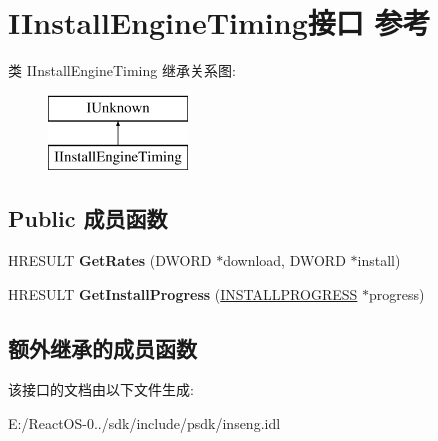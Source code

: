 \hypertarget{interface_i_install_engine_timing}{}\section{I\+Install\+Engine\+Timing接口 参考}
\label{interface_i_install_engine_timing}
类 I\+Install\+Engine\+Timing 继承关系图\+:\begin{figure}[H]
\begin{center}
\leavevmode
\includegraphics[height=2.000000cm]{interface_i_install_engine_timing}
\end{center}
\end{figure}
\subsection*{Public 成员函数}
\begin{DoxyCompactItemize}
\item 
\mbox{\label{interface_i_install_engine_timing_aa1d7d4b89801f175a8784e4498ed317c}} 
H\+R\+E\+S\+U\+LT {\bfseries Get\+Rates} (D\+W\+O\+RD $\ast$download, D\+W\+O\+RD $\ast$install)
\item 
\mbox{\label{interface_i_install_engine_timing_a6dc36a8c1fd644c377700977c16bf72c}} 
H\+R\+E\+S\+U\+LT {\bfseries Get\+Install\+Progress} (\hyperlink{struct_i_n_s_t_a_l_l_p_r_o_g_r_e_s_s}{I\+N\+S\+T\+A\+L\+L\+P\+R\+O\+G\+R\+E\+SS} $\ast$progress)
\end{DoxyCompactItemize}
\subsection*{额外继承的成员函数}


该接口的文档由以下文件生成\+:\begin{DoxyCompactItemize}
\item 
E\+:/\+React\+O\+S-\/0../sdk/include/psdk/inseng.\+idl\end{DoxyCompactItemize}
